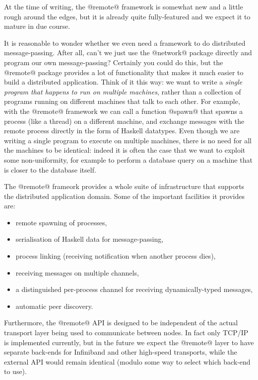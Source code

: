 At the time of writing, the @remote@ framework is somewhat new and a
little rough around the edges, but it is already quite fully-featured
and we expect it to mature in due course.

It is reasonable to wonder whether we even need a framework to do
distributed message-passing.  After all, can't we just use the
@network@ package directly and program our own message-passing?
Certainly you could do this, but the @remote@ package provides a lot
of functionality that makes it much easier to build a distributed
application.  Think of it this way: we want to write a \emph{single
  program that happens to run on multiple machines}, rather than a
collection of programs running on different machines that talk to each
other.  For example, with the @remote@ framework we can call a
function @spawn@ that spawns a process (like a thread) on a different
machine, and exchange messages with the remote process directly in the
form of Haskell datatypes.  Even though we are writing a single
program to execute on multiple machines, there is no need for all the
machines to be identical: indeed it is often the case that we want to
exploit some non-uniformity, for example to perform a database query
on a machine that is closer to the database itself.

The @remote@ frameork provides a whole suite of infrastructure that
supports the distributed application domain.  Some of the important
facilities it provides are:

\begin{itemize}
\item remote spawning of processes,
\item serialisation of Haskell data for message-passing,
\item process linking (receiving notification when another process dies),
\item receiving messages on multiple channels,
\item a distinguished per-process channel for receiving
  dynamically-typed messages,
\item automatic peer discovery.
\end{itemize}

Furthermore, the @remote@ API is designed to be independent of the
actual transport layer being used to communicate between nodes.  In
fact only TCP/IP is implemented currently, but in the future we expect
the @remote@ layer to have separate back-ends for Infiniband and other
high-speed transports, while the external API would remain identical
(modulo some way to select which back-end to use).

